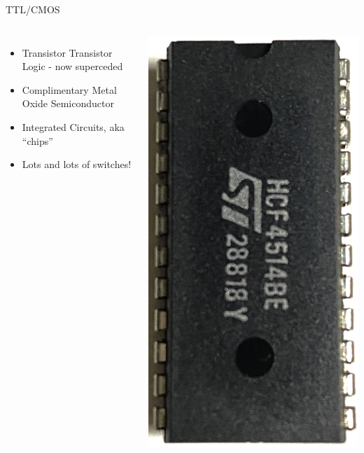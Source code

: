 \documentclass{beamer}
\begin{document}
\begin{frame}{TTL/CMOS}
  \begin{columns}
    \begin{itemize}
    \item
      Transistor Transistor Logic - now superceded
    \item
      Complimentary Metal Oxide Semiconductor
    \item
      Integrated Circuits, aka ``chips''
    \item
      Lots and lots of switches!
    \end{itemize}

    \includegraphics[scale=0.05]{../assets/IC-Picture.eps}
  \end{columns}    
\end{frame}
\end{document}
